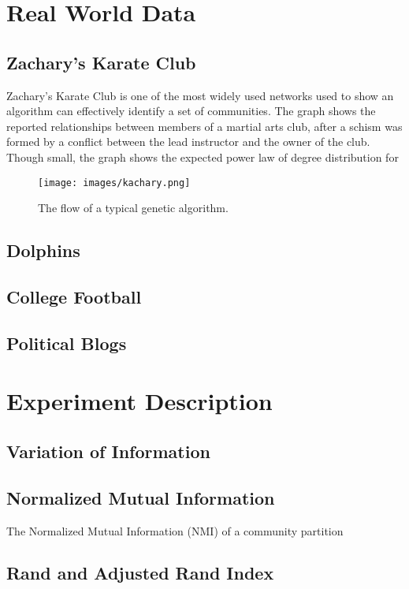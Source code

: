 \section{Real World Data}
\subsection{Zachary's Karate Club}
Zachary's Karate Club \cite{Zachary1977} is one of the most widely used networks used to show an algorithm can effectively identify a set of communities. The graph shows the reported relationships between members of a martial arts club, after a schism was formed by a conflict between the lead instructor and the owner of the club. Though small, the graph shows the expected power law of degree distribution for 

\begin{figure}[!htb]
	\begin{center}
		\texttt{[image: images/kachary.png]}
	\end{center}
	\caption{The flow of a typical genetic algorithm.}
	\label{logo}
\end{figure}

\subsection{Dolphins}
\cite{Lusseau2003}


\subsection{College Football}
\cite{Girvan2002}


\subsection{Political Blogs}
\cite{Adamic2005}


\section{Experiment Description}


\subsection{Variation of Information}
\cite{Marina2007}

\subsection{Normalized Mutual Information}
The Normalized Mutual Information (NMI) of a community partition 

\subsection{Rand and Adjusted Rand Index}
\cite{rand1971}